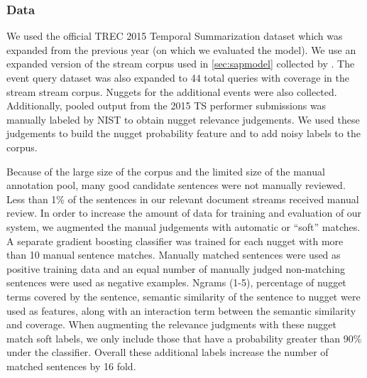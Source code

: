 \subsubsection{Data}
We used the official TREC 2015 Temporal Summarization dataset which 
was expanded from the previous year (on which we evaluated the \sap{} model).
We use an expanded version of the stream corpus used in \autoref{sec:sapmodel}
collected by \cite{frank2012building}. 
The event query dataset was also expanded to 44 total queries with coverage 
in the stream stream corpus. Nuggets for the additional events were also 
collected. Additionally, pooled output from the 2015 TS performer submissions
was manually labeled by NIST to obtain nugget relevance judgements. We used 
these judgements to build the nugget probability feature 
and to add noisy labels to the corpus.
 

 Because of the large size of the corpus and the limited size of the manual
 annotation pool,
 many good candidate sentences were not manually reviewed.
 Less than 1\% of the sentences in our relevant document streams received
 manual review.  In order to increase the amount of data for training and
 evaluation of our system, we augmented the manual judgements with automatic
 or ``soft'' matches. A separate gradient boosting classifier was trained for
 each nugget with more than 10 manual sentence matches.  Manually matched
 sentences were used as positive training data and an equal number of
 manually judged non-matching sentences were used as negative examples.
 Ngrams (1-5), percentage of nugget terms covered by the sentence,
 semantic similarity of the sentence to nugget were used as features, along
 with an interaction term between the semantic similarity and coverage. When
 augmenting the relevance judgments with these nugget match soft labels, we
 only include those that have a probability greater than 90\% under the
 classifier. Overall these additional labels increase the number of matched
 sentences by 16 fold.
 





